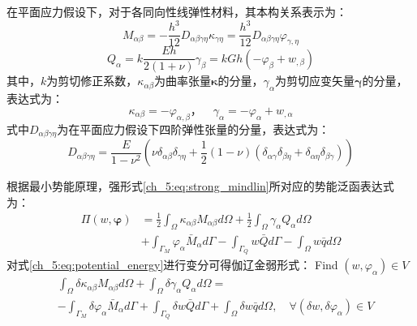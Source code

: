 在平面应力假设下，对于各同向性线弹性材料，其本构关系表示为：
\begin{equation}\label{ch_5:eq:mindlin_M}
    M_{\alpha \beta}=-\frac{h^3}{12}D_{\alpha \beta \gamma\eta}\kappa_{\gamma\eta}=\frac{h^3}{12}D_{\alpha \beta \gamma\eta}\varphi_{\gamma,\eta}
\end{equation}
\begin{equation}\label{ch_5:eq:mindlin_Q}
    Q_{\alpha}=k\frac{Eh}{2(1+\nu)}\gamma_\beta=kGh(-\varphi_\beta+w_{,\beta})
\end{equation}
其中，$k$为剪切修正系数，$\kappa_{\alpha\beta}$为曲率张量$\pmb\kappa$的分量，$\gamma_\alpha$为剪切应变矢量$\pmb\gamma$的分量，表达式为：
\begin{equation} \label{ch_5:eq:kappa}
    \kappa_{\alpha\beta}=-\varphi_{\alpha,\beta}，\quad\gamma_\alpha=-\varphi_\alpha+w_{,\alpha}
\end{equation}
式中$D_{\alpha \beta \gamma\eta}$为在平面应力假设下四阶弹性张量的分量，表达式为：
\begin{equation} 
    D_{\alpha \beta \gamma\eta}=\frac{E}{1-\nu^2}(\nu\delta_{\alpha\beta}\delta_{\gamma\eta}+\frac{1}{2}(1-\nu)(\delta_{\alpha\gamma}\delta_{\beta\eta}+\delta_{\alpha\eta}\delta_{\beta\gamma}))
\end{equation}

根据最小势能原理，强形式\eqref{ch_5:eq:strong_mindlin}所对应的势能泛函表达式为： 
\begin{equation}\label{ch_5:eq:potential_energy}
    \begin{split} 
        \Pi(w,\boldsymbol{\varphi})&=\frac{1}{2}\int_{\Omega}\kappa_{\alpha\beta}M_{\alpha\beta}d\Omega+\frac{1}{2}\int_{\Omega}\gamma_{\alpha}Q_{\alpha}d\Omega\\
        &+\int_{\Gamma_{M}}\varphi_{\alpha}{\bar{M}_{\alpha}}d\Gamma-\int_{\Gamma_{Q}}{w}\bar {Q}d\Gamma-\int_{\Omega} w\bar{q}d\Omega
    \end{split}
\end{equation}
对式\eqref{ch_5:eq:potential_energy}进行变分可得伽辽金弱形式：
Find $(w,\varphi_{\alpha})\in V$
\begin{equation}\label{ch_5:eq:weak_penalty_mindlin}
    \begin{split} 
        &\int_{\Omega}\delta\kappa_{\alpha\beta}M_{\alpha\beta}d\Omega+\int_{\Omega}\delta\gamma_{\alpha}Q_{\alpha}d\Omega=\\
        &-\int_{\Gamma_{M}}\delta\varphi_{\alpha}{\bar{M}_{\alpha}}d\Gamma+\int_{\Gamma_{Q}}{\delta{w}}\bar {Q}d\Gamma+\int_{\Omega} \delta{w}\bar{q}d\Omega,\quad \forall(\delta w,\delta\varphi_{\alpha}) \in V
    \end{split}
\end{equation}

